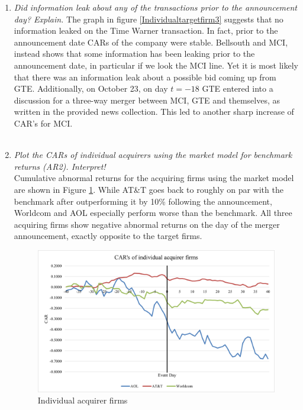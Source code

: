 \begin{enumerate}[label=\alph*),leftmargin=*]
\item \textit{Did information leak about any of the transactions prior to the announcement day? Explain.} \newline
The graph in figure \ref{Individualtargetfirm3} suggests that no information leaked on the Time Warner transaction. In fact, prior to the announcement date CARs of the company were stable. Bellsouth and MCI, instead shows that some information has been leaking prior to the announcement date, in particular if we look the MCI line. Yet it is most likely that there was an information leak about a possible bid coming up from GTE. Additionally, on October 23, on day $t=-18$ GTE entered into a discussion for a three-way merger between MCI, GTE and themselves, as written in the provided news collection. This led to another sharp increase of CAR's for MCI.\\\\

\item \textit{Plot the CARs of individual acquirers using the market model for benchmark returns (AR2). Interpret!}\\
Cumulative abnormal returns for the acquiring firms using the market model are shown in Figure \ref{aqu}.
While AT\&T goes back to roughly on par with the benchmark after outperforming it by 10\%
following the announcement, Worldcom and AOL especially perform worse than the
benchmark. All three acquiring firms show negative abnormal returns on the day of the merger
announcement, exactly opposite to the target firms.\newline

\begin{figure}[H]
    \centering
    \includegraphics[scale=0.75]{images/Bild4.png}
    \caption{Individual acquirer firms}
    \label{aqu}
\end{figure}
\end{enumerate}


